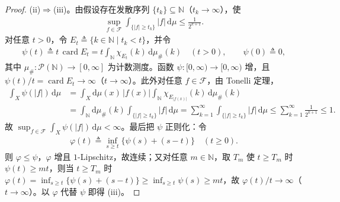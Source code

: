 \documentclass[../../main.tex]{subfiles}%
\begin{document}
\begin{proof}
(ii)$\Rightarrow$(iii)。由假设存在发散序列 $\{t_k\}\subseteq\mathbb N$（$t_k\to\infty$），使
\begin{align*}
\sup_{f\in\mathscr F}\int_{\{|f|\geqslant t_k\}}|f|\,\mathrm{d}\mu\leqslant\frac1{2^{k+1}}.
\end{align*}
对任意 $t>0$，令 $E_t\triangleq \{k\in\mathbb N\mid t_k<t\}$，并令
\begin{align*}
\psi(t)\triangleq t\,\operatorname{card}E_t=t\int_{\mathbb N}\chi_{E_t}(k)\,\mathrm{d}\mu_\#(k)\quad(t>0),\qquad\psi(0)\triangleq0,
\end{align*}
其中 $\mu_\#:\mathscr P(\mathbb N)\to[0,\infty]$ 为计数测度。函数 $\psi:[0,\infty)\to[0,\infty)$ 增，且 $\psi(t)/t=\operatorname{card}E_t\to\infty$（$t\to\infty$）。此外对任意 $f\in\mathscr F$，由 Tonelli 定理，
\begin{align*}
\int_X\psi(|f|)\,\mathrm{d}\mu
&=\int_X\mathrm{d}\mu(x)\,|f(x)|\int_{\mathbb N}\chi_{E_{|f(x)|}}(k)\,\mathrm{d}\mu_\#(k)\\
&=\int_{\mathbb N}\mathrm{d}\mu_\#(k)\int_{\{|f|\geqslant t_k\}}|f|\,\mathrm{d}\mu
=\sum_{k=1}^\infty\int_{\{|f|\geqslant t_k\}}|f|\,\mathrm{d}\mu
\leqslant\sum_{k=1}^\infty\frac1{2^{k+1}}\leqslant1.
\end{align*}
故 $\sup_{f\in\mathscr F}\int_X\psi(|f|)\,\mathrm{d}\mu<\infty$。最后把 $\psi$ 正则化：令
\begin{align*}
\varphi(t)\triangleq\inf_{s\geqslant t}\{\psi(s)+(s-t)\}\quad(t\geqslant0).
\end{align*}
则 $\varphi\leqslant\psi$，$\varphi$ 增且 $1$-Lipschitz，故连续；又对任意 $m\in\mathbb N$，取 $T_m$ 使 $t\geqslant T_m$ 时 $\psi(t)\geqslant mt$，则当 $t\geqslant T_m$ 时 $\varphi(t)=\inf_{s\geqslant t}\{\psi(s)+(s-t)\}\geqslant\inf_{s\geqslant t}\psi(s)\geqslant mt$，故 $\varphi(t)/t\to\infty$（$t\to\infty$）。以 $\varphi$ 代替 $\psi$ 即得 (iii)。
\end{proof}
\end{document}
